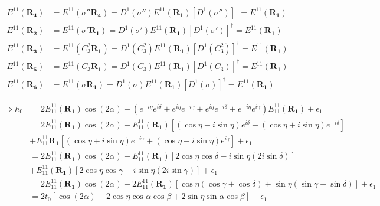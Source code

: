 \documentclass{article}
\begin{document}
\begin{align*}
    E^{11}(\mathbf{R_4}) & = E^{11}(\sigma''\mathbf{R_4}) = D^1(\sigma'') E^{11}(\mathbf{R_1}) \left[D^1(\sigma'')\right]^\dagger = E^{11}(\mathbf{R_1}) \\
    E^{11}(\mathbf{R_2}) & = E^{11}(\sigma'\mathbf{R_1}) = D^1(\sigma') E^{11}(\mathbf{R_1}) \left[D^1(\sigma')\right]^\dagger = E^{11}(\mathbf{R_1})    \\
    E^{11}(\mathbf{R_3}) & = E^{11}(C_3^2\mathbf{R_1}) = D^1(C_3^2) E^{11}(\mathbf{R_1}) \left[D^1(C_3^2)\right]^\dagger = E^{11}(\mathbf{R_1})          \\
    E^{11}(\mathbf{R_5}) & = E^{11}(C_3\mathbf{R_1}) = D^1(C_3) E^{11}(\mathbf{R_1}) \left[D^1(C_3)\right]^\dagger = E^{11}(\mathbf{R_1})                \\
    E^{11}(\mathbf{R_6}) & = E^{11}(\sigma\mathbf{R_1}) = D^1(\sigma) E^{11}(\mathbf{R_1}) \left[D^1(\sigma)\right]^\dagger = E^{11}(\mathbf{R_1})
\end{align*}

\begin{align*}
    \Rightarrow h_0 & = 2 E_{11}^{11}(\mathbf{R_1}) \cos (2\alpha) + (e^{-i\eta}e^{i\delta} + e^{i\eta}e^{-i\gamma} + e^{i\eta}e^{-i\delta} + e^{-i\eta}e^{i\gamma} ) E_{11}^{11}(\mathbf{R_1}) +\epsilon_1 \\
                    & = 2 E_{11}^{11}(\mathbf{R_1}) \cos (2\alpha) + E_{11}^{11}(\mathbf{R_1}) \left[(\cos\eta - i\sin\eta ) e^{i\delta} + (\cos\eta + i\sin\eta )e^{-i\delta} \right]                      \\
                    & + E_{11}^{11}\mathbf{R_1} \left[(\cos\eta + i \sin\eta)e^{-i\gamma} + (\cos\eta - i \sin\eta)e^{i\gamma}\right] +  \epsilon_1                                                         \\
                    & = 2 E_{11}^{11}(\mathbf{R_1}) \cos (2\alpha) + E_{11}^{11}(\mathbf{R_1}) \left[2\cos\eta \cos\delta - i\sin\eta( 2i\sin\delta)  \right]                                               \\
                    & + E_{11}^{11}(\mathbf{R_1}) \left[2\cos\eta \cos\gamma - i\sin\eta( 2i\sin\gamma)  \right] +   \epsilon_1                                                                             \\
                    & = 2 E_{11}^{11}(\mathbf{R_1}) \cos (2\alpha) + 2E_{11}^{11}(\mathbf{R_1}) \left[\cos\eta (\cos\gamma + \cos\delta) + \sin\eta(\sin\gamma + \sin\delta)\right] +   \epsilon_1          \\
                    & = 2 t_0 \left[ \cos (2\alpha) + 2\cos\eta \cos\alpha\cos\beta + 2\sin\eta\sin\alpha\cos\beta\right] +   \epsilon_1
\end{align*}
\end{document}
